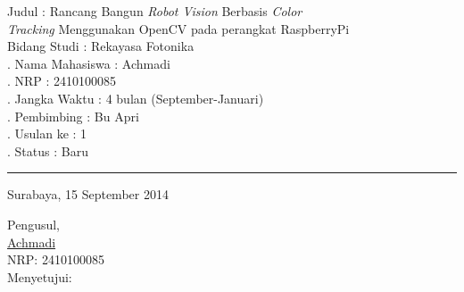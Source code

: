 \documentclass[a4paper,12pt]{article}
\begin{document}
\noindent Judul \hspace{80pt} : Rancang Bangun \textit{Robot Vision} Berbasis \textit{Color} \\[5pt]
\textit{Tracking} Menggunakan OpenCV pada perangkat RaspberryPi \\[5pt]
\noindent Bidang Studi \hspace{42pt} : Rekayasa Fotonika\\[5pt]
. Nama Mahasiswa \hspace{5pt} : Achmadi\\[5pt]
. NRP  \hspace{70pt} : 2410100085\\[5pt]
. Jangka Waktu \hspace{20pt} : 4 bulan (September-Januari)\\[5pt]
. Pembimbing \hspace{28pt} : Bu Apri\\[5pt]
. Usulan ke \hspace{40pt} : 1\\[5pt]
. Status \hspace{60pt} : Baru\\[5pt]
\rule{385pt}{5pt}
\begin{flushright}
  Surabaya, 15 September 2014
\end{flushright}
\begin{center}
 Pengusul,
 \\[40pt]
 \underline{Achmadi}\\
 NRP: 2410100085
 \\[40pt]
 Menyetujui:
\end{center}
\end{document}
